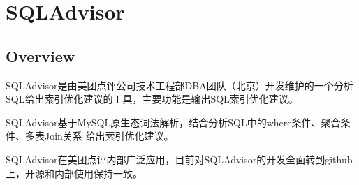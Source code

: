 \part{SQLAdvisor}


\chapter{Overview}

SQLAdvisor是由美团点评公司技术工程部DBA团队（北京）开发维护的一个分析SQL给出索引优化建议的工具，主要功能是输出SQL索引优化建议。

SQLAdvisor基于MySQL原生态词法解析，结合分析SQL中的where条件、聚合条件、多表Join关系 给出索引优化建议。

SQLAdvisor在美团点评内部广泛应用，目前对SQLAdvisor的开发全面转到github上，开源和内部使用保持一致。





